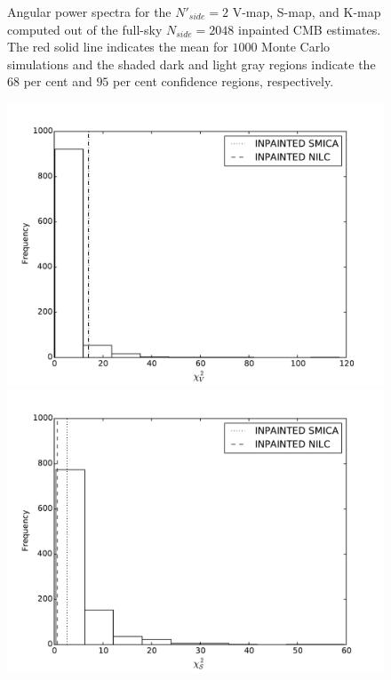 \begin{figure}
\caption{Angular power spectra for the $N'_{side} = 2$ V-map, S-map, and K-map computed out of the full-sky $N_{side} = 2048$ inpainted CMB estimates. The red solid line indicates the mean for $1000$ Monte Carlo simulations and the shaded dark and light gray regions indicate the $68$ per cent and $95$ per cent confidence regions, respectively.}
\label{Fig:1}
\end{figure}

\begin{figure}
\centering
\includegraphics[scale=0.3]{figures/chapter-vsk/vchi2.pdf}
\includegraphics[scale=0.3]{figures/chapter-vsk/schi2.pdf}\\

\end{figure}
